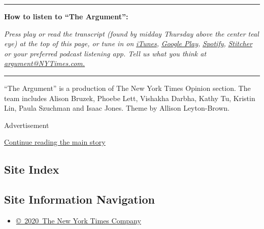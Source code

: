 \begin{center}\rule{0.5\linewidth}{\linethickness}\end{center}

\textbf{How to listen to ``The Argument'':}

\emph{Press play or read the transcript (found by midday Thursday above
the center teal eye) at the top of this page, or tune in on}
\href{https://itunes.apple.com/us/podcast/the-argument/id1438024613?mt=2}{\emph{iTunes}}\emph{,}
\href{https://play.google.com/music/listen?u=0\#/ps/Idxib4hsg3yviao4gtym76knjjy}{\emph{Google
Play}}\emph{,}
\href{https://open.spotify.com/episode/5fIsHqqunLBwoxPSUUSGre?si=Rz5D9VnlRFKdGMu8ixzBOw}{\emph{Spotify}}\emph{,}
\href{https://www.stitcher.com/podcast/the-new-york-times/the-argument}{\emph{Stitcher}}
\emph{or your preferred podcast listening app. Tell us what you think
at} \href{mailto:argument@NYTimes.com}{\emph{argument@NYTimes.com.}}

\begin{center}\rule{0.5\linewidth}{\linethickness}\end{center}

``The Argument'' is a production of The New York Times Opinion section.
The team includes Alison Bruzek, Phoebe Lett, Vishakha Darbha, Kathy Tu,
Kristin Lin, Paula Szuchman and Isaac Jones. Theme by Allison
Leyton-Brown.

Advertisement

\protect\hyperlink{after-bottom}{Continue reading the main story}

\hypertarget{site-index}{%
\subsection{Site Index}\label{site-index}}

\hypertarget{site-information-navigation}{%
\subsection{Site Information
Navigation}\label{site-information-navigation}}

\begin{itemize}
\tightlist
\item
  \href{https://help.nytimes3xbfgragh.onion/hc/en-us/articles/115014792127-Copyright-notice}{©~2020~The
  New York Times Company}
\end{itemize}

